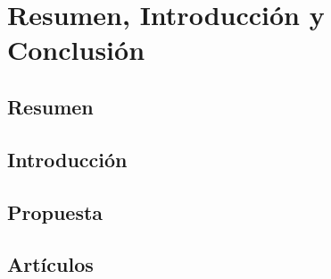 \chapter{Resumen, Introducción y Conclusión}
\label{cha:conclusion_sp}

\section{Resumen}


\section{Introducción}


\section{Propuesta}


\section{Artículos}
